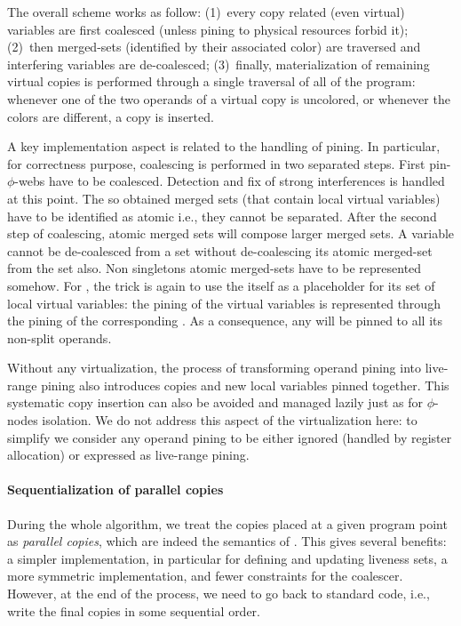         
The overall scheme works as follow: 
(1)~every copy related (even virtual) variables are first coalesced (unless pining to physical resources forbid it); 
(2)~then merged-sets (identified by their associated color) are traversed and interfering variables are de-coalesced; 
(3)~finally, materialization of remaining virtual copies is performed through a single traversal of all \phifuns of the program: 
whenever one of the two operands of a virtual copy is uncolored, or whenever the colors are different, a copy is inserted.

A key implementation aspect is related to the handling of pining. 
In particular, for correctness purpose, coalescing is performed in two separated steps. 
First pin-$\phi$-webs have to be coalesced. 
Detection and fix of strong interferences is handled at this point. 
The so obtained merged sets (that contain local virtual variables) have to be identified as atomic i.e., they cannot be separated. 
After the second step of coalescing, atomic merged sets will compose larger merged sets. 
A variable cannot be de-coalesced from a set without de-coalescing its atomic merged-set from the set also. 
Non singletons atomic merged-sets have to be represented somehow. 
For \phifuns, the trick is again to use the \phifun itself as a placeholder for its set of local virtual variables: 
the pining of the virtual variables is represented through the pining of the corresponding \phifun. 
As a consequence, any \phifun will be pinned to all its non-split operands.

Without any virtualization, the process of transforming operand pining into live-range pining also introduces copies and new local variables pinned together. 
This systematic copy insertion can also be avoided and managed lazily just as for $\phi$-nodes isolation. 
We do not address this aspect of the virtualization here: 
to simplify we consider any operand pining to be either ignored (handled by register allocation) or expressed as live-range pining.





\paragraph{Sequentialization of parallel copies}          
During the whole algorithm, we treat the copies placed at a given program point as \emph{parallel copies}, which are indeed the semantics of \phifuns. 
This gives several benefits: 
a simpler implementation, in particular for defining and updating liveness sets, a more symmetric implementation, and fewer constraints for the coalescer. 
However, at the end of the process, we need to go back to standard code, i.e., write the final copies in some sequential order.

